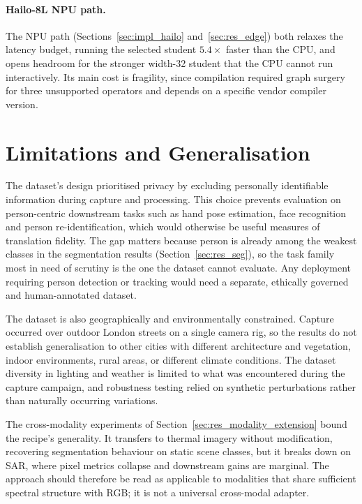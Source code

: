 \paragraph{Hailo-8L NPU path.}
The NPU path (Sections~\ref{sec:impl_hailo} and~\ref{sec:res_edge}) both relaxes the latency budget, running the selected student $5.4\times$ faster than the CPU, and opens headroom for the stronger width-32 student that the CPU cannot run interactively. Its main cost is fragility, since compilation required graph surgery for three unsupported operators and depends on a specific vendor compiler version.

\section{Limitations and Generalisation}
\label{sec:eval_limitations}

The dataset's design prioritised privacy by excluding personally identifiable information during capture and processing. This choice prevents evaluation on person-centric downstream tasks such as hand pose estimation, face recognition and person re-identification, which would otherwise be useful measures of translation fidelity. The gap matters because person is already among the weakest classes in the segmentation results (Section~\ref{sec:res_seg}), so the task family most in need of scrutiny is the one the dataset cannot evaluate. Any deployment requiring person detection or tracking would need a separate, ethically governed and human-annotated dataset.

The dataset is also geographically and environmentally constrained. Capture occurred over outdoor London streets on a single camera rig, so the results do not establish generalisation to other cities with different architecture and vegetation, indoor environments, rural areas, or different climate conditions. The dataset diversity in lighting and weather is limited to what was encountered during the capture campaign, and robustness testing relied on synthetic perturbations rather than naturally occurring variations.

The cross-modality experiments of Section~\ref{sec:res_modality_extension} bound the recipe's generality. It transfers to thermal imagery without modification, recovering segmentation behaviour on static scene classes, but it breaks down on SAR, where pixel metrics collapse and downstream gains are marginal. The approach should therefore be read as applicable to modalities that share sufficient spectral structure with RGB; it is not a universal cross-modal adapter.

